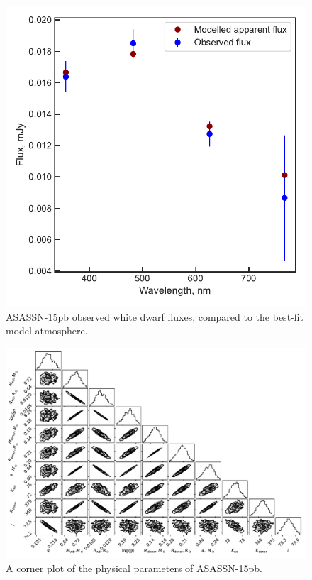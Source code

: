 \begin{figure}
    \centering
    \includegraphics[width=\textwidth]{figures/results/ASASSN-15pb/fluxplot.pdf}
    \caption{ASASSN-15pb observed white dwarf fluxes, compared to the best-fit model atmosphere.}
    \label{fig:ASASSN-15pb flux plot}
\end{figure}
\begin{figure}
    \includegraphics[height=\textwidth, angle=90]{figures/results/physicalparams_corners/ASASSN-15pb_physcorner.pdf}
    \caption{A corner plot of the physical parameters of ASASSN-15pb.}
\end{figure}
\clearpage



